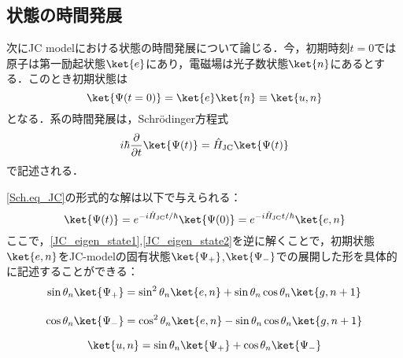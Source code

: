 \subsection{状態の時間発展}
次にJC modelにおける状態の時間発展について論じる．今，初期時刻$t=0$では原子は第一励起状態$\ket{e}$にあり，電磁場は光子数状態$\ket{n}$にあるとする．このとき初期状態は
\begin{equation}
    \ket{\Psi(t=0)}=\ket{e}\ket{n}\equiv\ket{u,n}
\end{equation}
となる．系の時間発展は，Schr\"{o}dinger方程式
\begin{equation}\label{Sch.eq_JC}
    i\hbar\frac{\partial}{\partial t}\ket{\Psi(t)}=\hat{H}_{\rm{JC}}\ket{\Psi(t)}
\end{equation}
で記述される．

\eqref{Sch.eq_JC}の形式的な解は以下で与えられる：
\begin{equation}\label{Solve_Sch.eq_JC}
    \ket{\Psi(t)}=e^{-i\hat{H}_{\rm{JC}}t/\hbar}\ket{\Psi(0)}=e^{-i\hat{H}_{\rm{JC}}t/\hbar}\ket{e,n}
\end{equation}
ここで，\eqref{JC_eigen_state1},\eqref{JC_eigen_state2}を逆に解くことで，初期状態$\ket{e,n}$をJC-modelの固有状態$\ket{\Psi_+}$,$\ket{\Psi_-}$での展開した形を具体的に記述することができる：
\begin{align}
    \sin\theta_n\ket{\Psi_+}&=\sin^2{\theta_n}\ket{e,n}+\sin{\theta_n}\cos\theta_n\ket{g,n+1}\\[10pt]
    \cos{\theta_n}\ket{\Psi_-}&=\cos^2{\theta_n}\ket{e,n}-\sin\theta_n\cos\theta_n\ket{g,n+1}
\end{align}

\begin{equation}\label{initial_state}
    \ket{u,n} = \sin{\theta_n}\ket{\Psi_+}+\cos{\theta_n}\ket{\Psi_-}
\end{equation}

